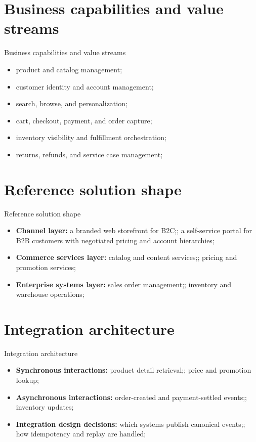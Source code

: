 \documentclass[aspectratio=169]{beamer}
\begin{document}
\section{Business capabilities and value streams}

\begin{frame}{Business capabilities and value streams}
  \begin{itemize}
    \item product and catalog management;
    \item customer identity and account management;
    \item search, browse, and personalization;
    \item cart, checkout, payment, and order capture;
    \item inventory visibility and fulfillment orchestration;
    \item returns, refunds, and service case management;
  \end{itemize}
\end{frame}

\section{Reference solution shape}

\begin{frame}{Reference solution shape}
  \begin{itemize}
    \item \textbf{Channel layer:} a branded web storefront for B2C;; a self-service portal for B2B customers with negotiated pricing and account hierarchies;
    \item \textbf{Commerce services layer:} catalog and content services;; pricing and promotion services;
    \item \textbf{Enterprise systems layer:} sales order management;; inventory and warehouse operations;
  \end{itemize}
\end{frame}

\section{Integration architecture}

\begin{frame}{Integration architecture}
  \begin{itemize}
    \item \textbf{Synchronous interactions:} product detail retrieval;; price and promotion lookup;
    \item \textbf{Asynchronous interactions:} order-created and payment-settled events;; inventory updates;
    \item \textbf{Integration design decisions:} which systems publish canonical events;; how idempotency and replay are handled;
  \end{itemize}
\end{frame}
\end{document}
